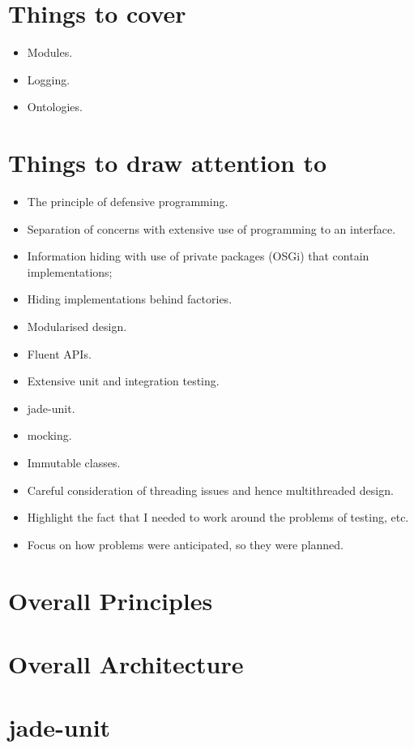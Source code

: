 \section{Things to cover}
\begin{itemize}
\item Modules.
\item Logging.
\item Ontologies.
\end{itemize}

\section{Things to draw attention to}
\begin{itemize}
\item The principle of defensive programming.
\item Separation of concerns with extensive use of programming to an interface.
\item Information hiding with use of private packages (OSGi) that contain implementations;
\item Hiding implementations behind factories.
\item Modularised design.
\item Fluent APIs.
\item Extensive unit and integration testing.
\item jade-unit.
\item mocking.
\item Immutable classes.
\item Careful consideration of threading issues and hence multithreaded design.
\item Highlight the fact that I needed to work around the problems of testing, etc.
\item Focus on how problems were anticipated, so they were planned.

\end{itemize}

\section{Overall Principles}

\section{Overall Architecture}

\section{jade-unit}

